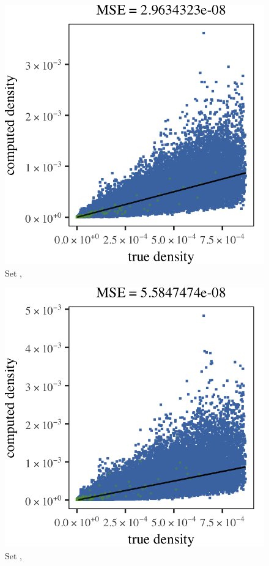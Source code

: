 \begin{subfigure}{0.23\textwidth}
	\centering
	\includegraphics[keepaspectratio=true, width=\textwidth, height=0.23\textheight]{result/img/results_baakman_4_60000_sambe_silverman}
	\caption{Set \baakmanFour, \sambe}
	\label{fig:results:singlesphere:sambe:baakman4}
\end{subfigure}		
\begin{subfigure}{0.23\textwidth}
	\centering
	\includegraphics[keepaspectratio=true, width=\textwidth, height=0.23\textheight]{result/img/results_baakman_5_60000_sambe_silverman}
	\caption{Set \baakmanFive, \sambe}
	\label{fig:results:singlesphere:sambe:baakman5}
\end{subfigure}	